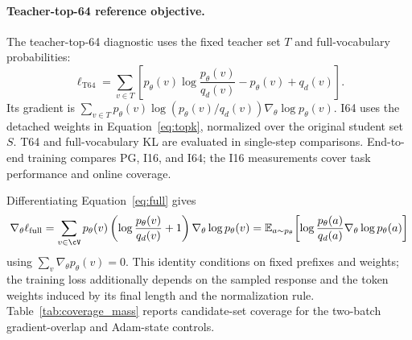 \paragraph{Teacher-top-64 reference objective.}
The teacher-top-64 diagnostic uses the fixed teacher set $T$ and full-vocabulary probabilities:
\begin{equation}
\ell_{\mathrm{T64}}=\sum_{v\in T}\left[p_\theta(v)\log\frac{p_\theta(v)}{q_d(v)}-p_\theta(v)+q_d(v)\right].
\label{eq:t64}
\end{equation}
Its gradient is $\sum_{v\in T}p_\theta(v)\log(p_\theta(v)/q_d(v))\nabla_\theta\log p_\theta(v)$. I64 uses the detached weights in Equation~\ref{eq:topk}, normalized over the original student set $S$. T64 and full-vocabulary KL are evaluated in single-step comparisons. End-to-end training compares PG, I16, and I64; the I16 measurements cover task performance and online coverage.

Differentiating Equation~\ref{eq:full} gives
\begin{align}
\nabla_\theta\ell_{\mathrm{full}}
=\sum_{v\in\cV}p_\theta(v)\left(\log\frac{p_\theta(v)}{q_d(v)}+1\right)\nabla_\theta\log p_\theta(v)
=\mathbb E_{a\sim p_\theta}\!\left[\log\frac{p_\theta(a)}{q_d(a)}\nabla_\theta\log p_\theta(a)\right]
\end{align}
using $\sum_v\nabla_\theta p_\theta(v)=0$. This identity conditions on fixed prefixes and weights; the training loss additionally depends on the sampled response and the token weights induced by its final length and the normalization rule. Table~\ref{tab:coverage_mass} reports candidate-set coverage for the two-batch gradient-overlap and Adam-state controls.

\begin{table}[t]
\caption{\textbf{The teacher top-64 set captures nearly all student probability mass in these controls.} Means over sampled prefixes; gradient norms use domain-specific inputs. Entropy is in nats, and 100\% may reflect rounding.}
\label{tab:coverage_mass}
\centering\small

\end{table}


